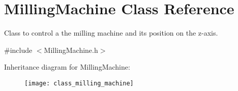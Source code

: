 \hypertarget{class_milling_machine}{\section{Milling\+Machine Class Reference}
\label{class_milling_machine}
}


Class to control a the milling machine and its position on the z-\/axis.  




{\ttfamily \#include $<$Milling\+Machine.\+h$>$}

Inheritance diagram for Milling\+Machine\+:\begin{figure}[H]
\begin{center}
\leavevmode
\texttt{[image: class\_milling\_machine]}
\end{center}
\end{figure}

